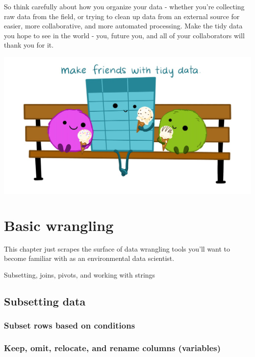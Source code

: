 \documentclass[
]{book}
\begin{document}
So think carefully about how you organize your data - whether you're collecting raw data from the field, or trying to clean up data from an external source for easier, more collaborative, and more automated processing. Make the tidy data you hope to see in the world - you, future you, and all of your collaborators will thank you for it.

\includegraphics{images/tidydata_7.jpg}

\hypertarget{basic-wrangling}{%
\chapter{Basic wrangling}\label{basic-wrangling}}

This chapter just scrapes the surface of data wrangling tools you'll want to become familiar with as an environmental data scientist.

Subsetting, joins, pivots, and working with strings

\hypertarget{subsetting-data}{%
\section{Subsetting data}\label{subsetting-data}}

\hypertarget{subset-rows-based-on-conditions}{%
\subsection{Subset rows based on conditions}\label{subset-rows-based-on-conditions}}

\hypertarget{keep-omit-relocate-and-rename-columns-variables}{%
\subsection{Keep, omit, relocate, and rename columns (variables)}\label{keep-omit-relocate-and-rename-columns-variables}}
\end{document}
